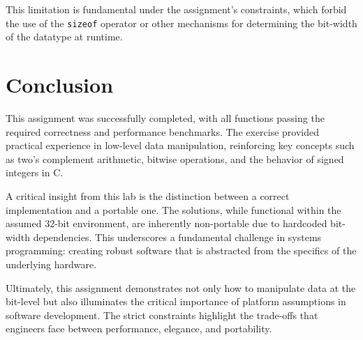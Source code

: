 \documentclass{article}
\begin{document}
This limitation is fundamental under the assignment's constraints, which forbid
the use of the \verb|sizeof| operator or other mechanisms for determining the
bit-width of the datatype at runtime.

\section{Conclusion}

This assignment was successfully completed, with all functions passing the
required correctness and performance benchmarks. The exercise provided
practical experience in low-level data manipulation, reinforcing key concepts
such as two's complement arithmetic, bitwise operations, and the behavior of
signed integers in C.

A critical insight from this lab is the distinction between a correct 
implementation and a portable one. The solutions, while functional within the
assumed 32-bit environment, are inherently non-portable due to hardcoded 
bit-width dependencies. This underscores a fundamental challenge in systems 
programming: creating robust software that is abstracted from the specifics of 
the underlying hardware.

Ultimately, this assignment demonstrates not only how to manipulate data at the 
bit-level but also illuminates the critical importance of platform assumptions 
in software development. The strict constraints highlight the trade-offs that 
engineers face between performance, elegance, and portability.
\end{document}
